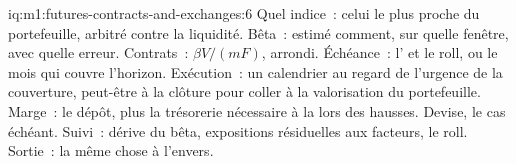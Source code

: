 \begin{solution}{iq:m1:futures-contracts-and-exchanges:6}
Quel indice~: celui le plus proche du portefeuille, arbitré contre la liquidité.
Bêta~: estimé comment, sur quelle fenêtre, avec quelle erreur. Contrats~: $\beta
V/(mF)$, arrondi. Échéance~: l' et le roll, ou le mois qui couvre
l'horizon. Exécution~: un calendrier au regard de l'urgence de la couverture, peut-être à la
clôture pour coller à la valorisation du portefeuille. Marge~: le dépôt, plus la trésorerie
nécessaire à la  lors des hausses. Devise, le cas échéant. Suivi~: dérive du bêta,
expositions résiduelles aux facteurs, le roll. Sortie~: la même chose à l'envers.
\end{solution}
